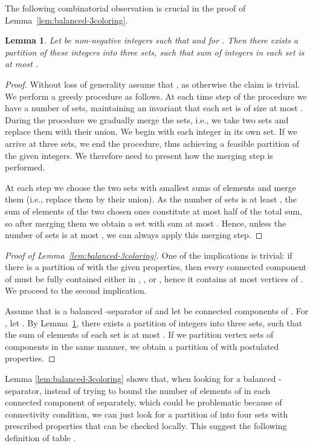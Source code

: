 \documentclass[a4paper,11pt]{article}
\newtheorem{lemma}{Lemma}[section]
\theoremstyle{definition}
\theoremstyle{remark}
\begin{document}
The following combinatorial observation is crucial in the proof of
Lemma~\ref{lem:balanced-3coloring}.

\begin{lemma}\label{lem:comb-balanced-3coloring}
  Let  be non-negative integers such that  and  for .  Then there exists
  a partition of these integers into three sets, such that sum of
  integers in each set is at most .
\end{lemma}
\begin{proof}
  Without loss of generality assume that , as otherwise the claim
  is trivial.
  We perform a greedy procedure as follows.  At each time step of the
  procedure we have a number of sets, maintaining an invariant that each
  set is of size at most .  During the procedure we gradually
  merge the sets, i.e., we take two sets and replace them with their
  union.  We begin with each integer in its own set.  If we arrive at
  three sets, we end the procedure, thus achieving a feasible
  partition of the given integers.  We therefore need to present how
  the merging step is performed.
  
  At each step we choose the two sets with smallest sums of elements
  and merge them (i.e., replace them by their union).  As the number
  of sets is at least , the sum of elements of the two chosen ones
  constitute at most half of the total sum, so after merging them we
  obtain a set with sum at most .  Hence, unless the number of
  sets is at most , we can always apply this merging step.
\end{proof}

\begin{proof}[Proof of Lemma~\ref{lem:balanced-3coloring}]
  One of the implications is trivial: if there is a partition
   of  with the given properties, then
  every connected component of  must be fully contained
  either in , , or , hence it contains at most 
  vertices of .  We proceed to the second implication.
  
  Assume that  is a balanced -separator of  and let
   be connected components of .  For
  , let .  By
  Lemma~\ref{lem:comb-balanced-3coloring}, there exists a partition
  of integers  into three sets, such that the sum of elements of
  each set is at most .  If we partition vertex sets of
  components  in the same manner, we obtain a
  partition  of  with postulated properties.
\end{proof}

Lemma \ref{lem:balanced-3coloring} shows that, when looking for a
balanced -separator, instead of trying to bound the number of
elements of  in each connected component of 
separately, which could be problematic because of connectivity
condition, we can just look for a partition of  into four
sets with prescribed properties that can be checked locally.  This
suggest the following definition of table .
\end{document}
